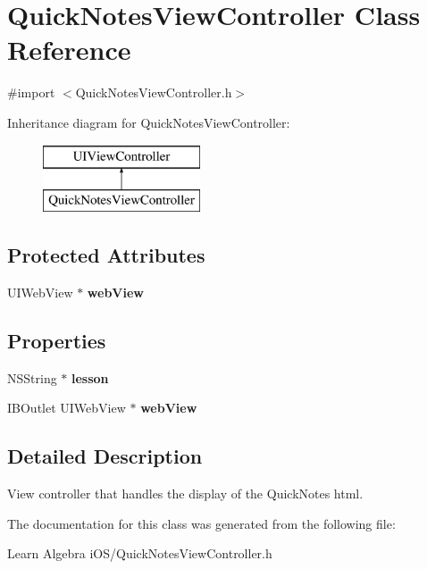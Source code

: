 \hypertarget{interface_quick_notes_view_controller}{\section{Quick\-Notes\-View\-Controller Class Reference}
\label{interface_quick_notes_view_controller}
}


{\ttfamily \#import $<$Quick\-Notes\-View\-Controller.\-h$>$}

Inheritance diagram for Quick\-Notes\-View\-Controller\-:\begin{figure}[H]
\begin{center}
\leavevmode
\includegraphics[height=2.000000cm]{interface_quick_notes_view_controller}
\end{center}
\end{figure}
\subsection*{Protected Attributes}
\begin{DoxyCompactItemize}
\item 
\hypertarget{interface_quick_notes_view_controller_afadeba01b30e91988af2f7852aa2b6af}{U\-I\-Web\-View $\ast$ {\bfseries web\-View}}\label{interface_quick_notes_view_controller_afadeba01b30e91988af2f7852aa2b6af}

\end{DoxyCompactItemize}
\subsection*{Properties}
\begin{DoxyCompactItemize}
\item 
\hypertarget{interface_quick_notes_view_controller_a54b90196a5029435f31c406955b749a6}{N\-S\-String $\ast$ {\bfseries lesson}}\label{interface_quick_notes_view_controller_a54b90196a5029435f31c406955b749a6}

\item 
\hypertarget{interface_quick_notes_view_controller_abfa269c6bc556f91f4eaf19c188a6d56}{I\-B\-Outlet U\-I\-Web\-View $\ast$ {\bfseries web\-View}}\label{interface_quick_notes_view_controller_abfa269c6bc556f91f4eaf19c188a6d56}

\end{DoxyCompactItemize}


\subsection{Detailed Description}
View controller that handles the display of the Quick\-Notes html. 

The documentation for this class was generated from the following file\-:\begin{DoxyCompactItemize}
\item 
Learn Algebra i\-O\-S/Quick\-Notes\-View\-Controller.\-h\end{DoxyCompactItemize}
